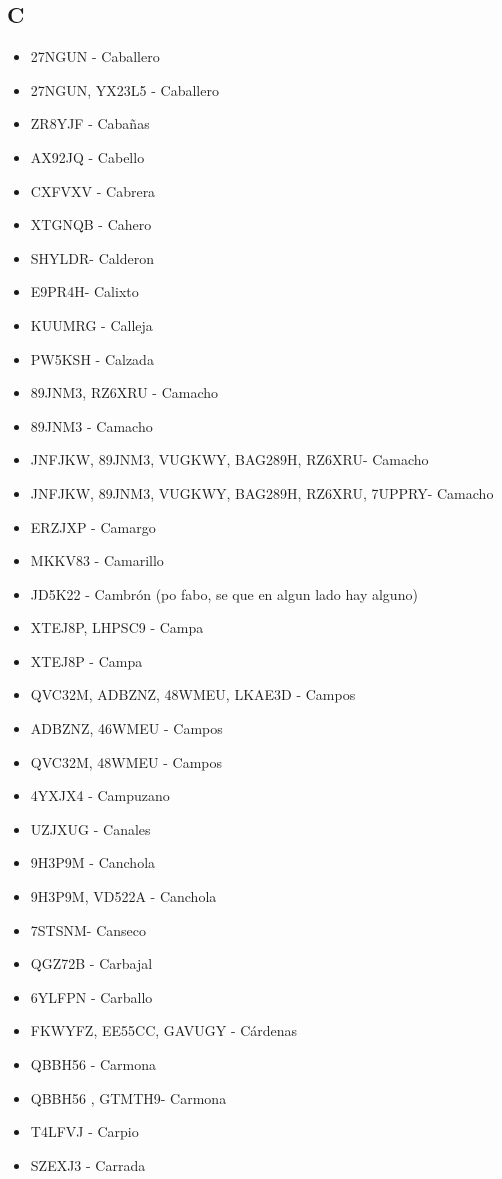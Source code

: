 \subsection*{C}
\begin{itemize}[leftmargin=*,nosep]
\item 27NGUN - Caballero
\item 27NGUN, YX23L5 - Caballero
\item ZR8YJF - Cabañas
\item AX92JQ - Cabello
\item CXFVXV - Cabrera
\item XTGNQB - Cahero
\item SHYLDR- Calderon
\item E9PR4H- Calixto
\item KUUMRG - Calleja
\item PW5KSH - Calzada
\item 89JNM3, RZ6XRU - Camacho
\item 89JNM3 - Camacho
\item JNFJKW, 89JNM3, VUGKWY, BAG289H, RZ6XRU- Camacho
\item JNFJKW, 89JNM3, VUGKWY, BAG289H, RZ6XRU, 7UPPRY- Camacho
\item ERZJXP - Camargo
\item MKKV83 - Camarillo
\item JD5K22 - Cambrón (po fabo, se que en algun lado hay alguno)
\item XTEJ8P, LHPSC9 - Campa
\item XTEJ8P - Campa
\item QVC32M, ADBZNZ, 48WMEU, LKAE3D - Campos
\item ADBZNZ, 46WMEU  -  Campos
\item QVC32M, 48WMEU - Campos
\item 4YXJX4  -  Campuzano
\item UZJXUG - Canales
\item 9H3P9M - Canchola
\item 9H3P9M, VD522A - Canchola
\item 7STSNM- Canseco
\item QGZ72B  -  Carbajal
\item 6YLFPN - Carballo
\item FKWYFZ, EE55CC, GAVUGY - Cárdenas
\item QBBH56  -  Carmona
\item QBBH56 , GTMTH9- Carmona
\item T4LFVJ  -  Carpio
\item SZEXJ3  -  Carrada

\end{itemize}
